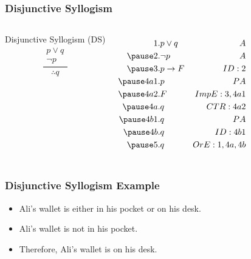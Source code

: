 \documentclass[dvipsnames]{beamer}
\begin{document}
\begin{frame}
  \frametitle{Disjunctive Syllogism}

  \begin{columns}
    \begin{block}{Disjunctive Syllogism (DS)}
      \[
      \frac
        {
          \begin{array}{c}
            p \vee q\\
            \neg p
          \end{array}
        }
        {
          \therefore q
        }
      \]
    \end{block}

    \pause
    \begin{eqnarray*}
      1.   & p \vee q        & A\\
      \pause
      2.   & \neg p          & A\\
      \pause
      3.   & p \rightarrow F & ID:2\\
      \pause
      4a1. & p               & PA\\
      \pause
      4a2. & F               & ImpE:3,4a1\\
      \pause
      4a.  & q               & CTR:4a2\\
      \pause
      4b1. & q               & PA\\
      \pause
      4b.  & q               & ID:4b1\\
      \pause
      5.   & q               & OrE:1,4a,4b
    \end{eqnarray*}
  \end{columns}
\end{frame}

\begin{frame}
  \frametitle{Disjunctive Syllogism Example}

  \begin{example}
    \begin{itemize}
      \item Ali's wallet is either in his pocket or on his desk.
      \item Ali's wallet is not in his pocket.

      \pause
      \medskip
      \item Therefore, Ali's wallet is on his desk.
    \end{itemize}
  \end{example}
\end{frame}
\end{document}
